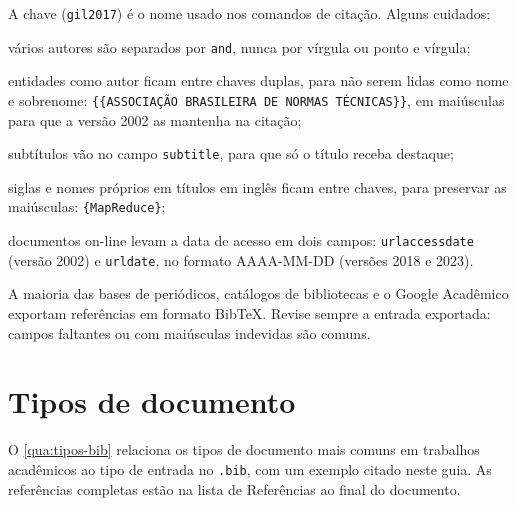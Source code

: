 \documentclass[
	12pt, %
	openright, %
	oneside, %
	a4paper, %
	sumario=tradicional, %
	english, %
	brazil, %
]{abntex2}
\begin{document}
A chave (\texttt{gil2017}) é o nome usado nos comandos de citação. Alguns cuidados:

\begin{alineas}
	\item vários autores são separados por \texttt{and}, nunca por vírgula ou ponto e vírgula;
	\item entidades como autor ficam entre chaves duplas, para não serem lidas como nome e sobrenome: \verb|{{ASSOCIAÇÃO BRASILEIRA DE NORMAS TÉCNICAS}}|, em maiúsculas para que a versão 2002 as mantenha na citação;
	\item subtítulos vão no campo \texttt{subtitle}, para que só o título receba destaque;
	\item siglas e nomes próprios em títulos em inglês ficam entre chaves, para preservar as maiúsculas: \verb|{MapReduce}|;
	\item documentos on-line levam a data de acesso em dois campos: \texttt{urlaccessdate} (versão 2002) e \texttt{urldate}, no formato AAAA-MM-DD (versões 2018 e 2023).
\end{alineas}

A maioria das bases de periódicos, catálogos de bibliotecas e o Google Acadêmico exportam referências em formato Bib\TeX. Revise sempre a entrada exportada: campos faltantes ou com maiúsculas indevidas são comuns.

\section{Tipos de documento}\label{sec:tipos-documento}

O \autoref{qua:tipos-bib} relaciona os tipos de documento mais comuns em trabalhos acadêmicos ao tipo de entrada no \texttt{.bib}, com um exemplo citado neste guia. As referências completas estão na lista de Referências ao final do documento.
\end{document}
